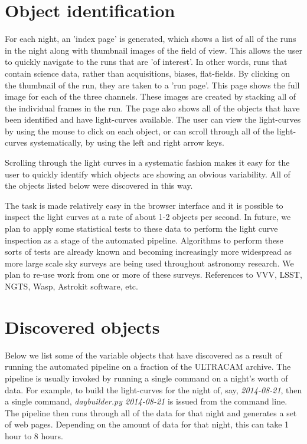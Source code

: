
\section{Object identification}
For each night, an 'index page' is generated, which shows a list of all of the runs in the night along with thumbnail images of the field of view. This allows the user to quickly navigate to the runs that are 'of interest'. In other words, runs that contain science data, rather than acquisitions, biases, flat-fields. By clicking on the thumbnail of the run, they are taken to a 'run page'. This page shows the full image for each of the three channels. These images are created by stacking all of the individual frames in the run. The page also shows all of the objects that have been identified and have light-curves available. The user can view the light-curves by using the mouse to click on each object, or can scroll through all of the light-curves systematically, by using the left and right arrow keys. 

Scrolling through the light curves in a systematic fashion makes it easy for the user to quickly identify which objects are showing an obvious variability. All of the objects listed below were discovered in this way. 

The task is made relatively easy in the browser interface and it is possible to inspect the light curves at a rate of about 1-2 objects per second. In future, we plan to apply some statistical tests to these data to perform the light curve inspection as a stage of the automated pipeline. Algorithms to perform these sorts of tests are already known and becoming increasingly more widespread as more large scale sky surveys are being used throughout astronomy research. We plan to re-use work from one or more of these surveys. References to VVV, LSST, NGTS, Wasp, Astrokit software, etc.

\section{Discovered objects}

Below we list some of the variable objects that have discovered as a result of running the automated pipeline on a fraction of the ULTRACAM archive. The pipeline is usually invoked by running a single command on a night's worth of data. For example, to build the light-curves for the night of, say, \emph{2014-08-21}, then a single command, \emph{daybuilder.py 2014-08-21} is issued from the command line. The pipeline then runs through all of the data for that night and generates a set of web pages. Depending on the amount of data for that night, this can take 1 hour to 8 hours. 

